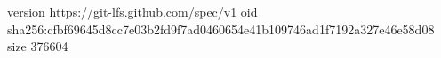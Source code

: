 version https://git-lfs.github.com/spec/v1
oid sha256:cfbf69645d8cc7e03b2fd9f7ad0460654e41b109746ad1f7192a327e46e58d08
size 376604
